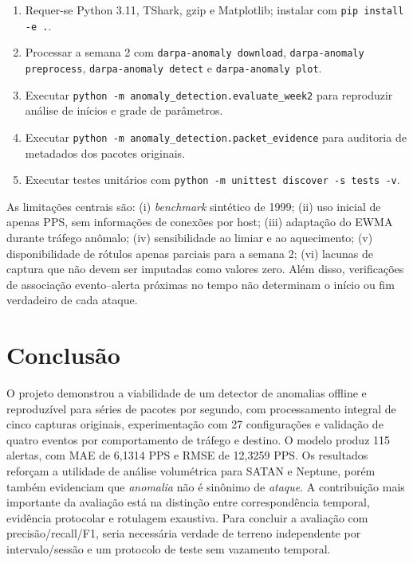 \documentclass[12pt,oneside,a4paper,brazil]{abntex2}
\begin{document}
\begin{enumerate}
\item Requer-se Python 3.11, TShark, gzip e Matplotlib; instalar com \texttt{pip install -e .}.
\item Processar a semana 2 com \texttt{darpa-anomaly download}, \texttt{darpa-anomaly preprocess}, \texttt{darpa-anomaly detect} e \texttt{darpa-anomaly plot}.
\item Executar \texttt{python -m anomaly\_detection.evaluate\_week2} para reproduzir análise de inícios e grade de parâmetros.
\item Executar \texttt{python -m anomaly\_detection.packet\_evidence} para auditoria de metadados dos pacotes originais.
\item Executar testes unitários com \texttt{python -m unittest discover -s tests -v}.
\end{enumerate}

As limitações centrais são: (i) \textit{benchmark} sintético de 1999; (ii) uso inicial de apenas PPS, sem informações de conexões por host; (iii) adaptação do EWMA durante tráfego anômalo; (iv) sensibilidade ao limiar e ao aquecimento; (v) disponibilidade de rótulos apenas parciais para a semana 2; (vi) lacunas de captura que não devem ser imputadas como valores zero. Além disso, verificações de associação evento--alerta próximas no tempo não determinam o início ou fim verdadeiro de cada ataque.

\chapter{Conclusão}
O projeto demonstrou a viabilidade de um detector de anomalias offline e reproduzível para séries de pacotes por segundo, com processamento integral de cinco capturas originais, experimentação com 27 configurações e validação de quatro eventos por comportamento de tráfego e destino. O modelo produz 115 alertas, com MAE de 6,1314 PPS e RMSE de 12,3259 PPS. Os resultados reforçam a utilidade de análise volumétrica para SATAN e Neptune, porém também evidenciam que \emph{anomalia} não é sinônimo de \emph{ataque}. A contribuição mais importante da avaliação está na distinção entre correspondência temporal, evidência protocolar e rotulagem exaustiva. Para concluir a avaliação com precisão/recall/F1, seria necessária verdade de terreno independente por intervalo/sessão e um protocolo de teste sem vazamento temporal.
\end{document}
